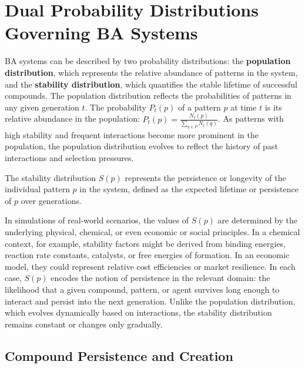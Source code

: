 \documentclass[preprint,12pt]{elsarticle}
\begin{document}
\section{Dual Probability Distributions Governing BA Systems}

BA systems can be described by two probability distributions: the \textbf{population distribution}, which represents the relative abundance of patterns in the system, and the \textbf{stability distribution}, which quantifies the stable lifetime of successful compounds. The population distribution reflects the probabilities of patterns in any given generation \( t \). The probability \( P_t(p) \) of a pattern \( p \) at time \( t \) is its relative abundance in the population: $P_t(p) = \frac{N_t(p)}{\sum_{q \in P} N_t(q)}$. As patterns with high stability and frequent interactions become more prominent in the population, the population distribution evolves to reflect the history of past interactions and selection pressures.

The stability distribution \( S(p) \) represents the persistence or longevity of the individual pattern \( p \) in the system, defined as the expected lifetime or persistence of \( p \) over generations.

In simulations of real-world scenarios, the values of \(S(p)\) are determined by the underlying physical, chemical, or even economic or social principles. In a chemical context, for example, stability factors might be derived from binding energies, reaction rate constants, catalysts, or free energies of formation. In an economic model, they could represent relative cost efficiencies or market resilience. In each case, \(S(p)\) encodes the notion of persistence in the relevant domain: the likelihood that a given compound, pattern, or agent survives long enough to interact and persist into the next generation. Unlike the population distribution, which evolves dynamically based on interactions, the stability distribution remains constant or changes only gradually. 

\subsection{Compound Persistence and Creation}
\end{document}
